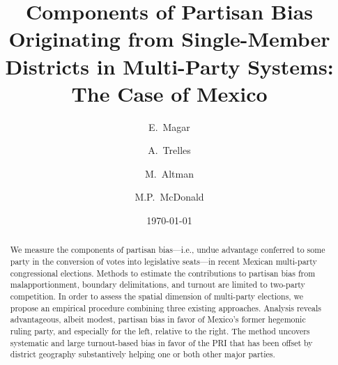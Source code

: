 \documentclass[preprint,authoryear,letter,12pt]{elsarticle} %
\begin{document}
\title{Components of Partisan Bias Originating from Single-Member Districts in Multi-Party Systems: The Case of Mexico}
\author[itam]{E.~Magar} 
\author[pitt]{A.~Trelles} 
\author[mit]{M.~Altman} 
\author[ufl]{M.P.~McDonald} 
\address[itam]{Instituto Tecnol\'ogico Aut\'onomo de M\'exico, Depto de Ciencia Pol\'itica, R\'io Hondo 1, Tizap\'an San Angel, M\'exico DF 01000, Mexico, Tel +52(55)5628-4079, Fax +52(55)5490-4672}
\address[pitt]{University of Pittsburgh, 4600 Wesley W. Posvar Hall, Pittsburgh PA 15260, USA}
\address[mit]{Massachusetts Institute of Technology, E25-131, 77 Massachusetts Ave, Cambridge MA 02139, USA}
\address[ufl]{University of Florida, 234 Anderson Hall, Gainesville FL 32611, USA}

\date{\today}

\begin{abstract}
\noindent We measure the components of partisan bias---i.e., undue advantage conferred to some party in the conversion of votes into legislative seats---in recent Mexican multi-party congressional elections. Methods to estimate the contributions to partisan bias from malapportionment, boundary delimitations, and turnout are limited to two-party competition. In order to assess the spatial dimension of multi-party elections, we propose an empirical procedure combining three existing approaches. Analysis reveals advantageous, albeit modest, partisan bias in favor of Mexico's former hegemonic ruling party, and especially for the left, relative to the right. The method uncovers systematic and large turnout-based bias in favor of the PRI that has been offset by district geography substantively helping one or both other major parties. 
\end{abstract}
\end{document}
